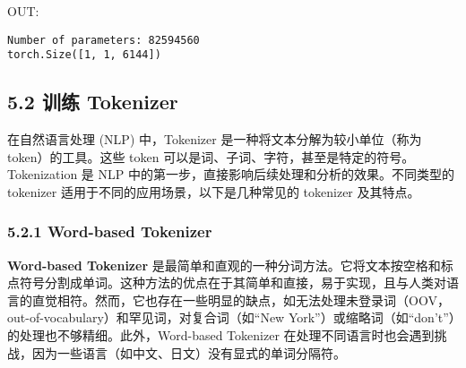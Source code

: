 \documentclass[12pt,a4paper]{book}
\begin{document}
\begin{Shaded}
\begin{Highlighting}[]
\OperatorTok{=}\NormalTok{, }\NormalTok{, (}\NormalTok{, }\NormalTok{)) }
\OperatorTok{=}\OperatorTok{=}
\OperatorTok{=} 
\NormalTok{(}

\OperatorTok{=}
\end{Highlighting}
\end{Shaded}

OUT:

\begin{verbatim}
Number of parameters: 82594560
torch.Size([1, 1, 6144])
\end{verbatim}

\subsection{5.2 训练 Tokenizer}\label{ux8badux7ec3-tokenizer}

在自然语言处理 (NLP) 中，Tokenizer 是一种将文本分解为较小单位（称为
token）的工具。这些 token
可以是词、子词、字符，甚至是特定的符号。Tokenization 是 NLP
中的第一步，直接影响后续处理和分析的效果。不同类型的 tokenizer
适用于不同的应用场景，以下是几种常见的 tokenizer 及其特点。

\subsubsection{5.2.1 Word-based Tokenizer}\label{word-based-tokenizer}

\textbf{Word-based Tokenizer}
是最简单和直观的一种分词方法。它将文本按空格和标点符号分割成单词。这种方法的优点在于其简单和直接，易于实现，且与人类对语言的直觉相符。然而，它也存在一些明显的缺点，如无法处理未登录词（OOV，out-of-vocabulary）和罕见词，对复合词（如``New
York''）或缩略词（如``don't''）的处理也不够精细。此外，Word-based
Tokenizer
在处理不同语言时也会遇到挑战，因为一些语言（如中文、日文）没有显式的单词分隔符。
\end{document}
